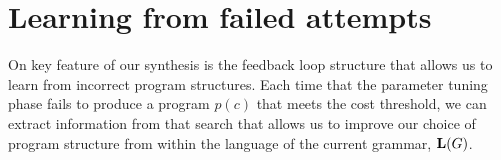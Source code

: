 \section{Learning from failed attempts}

On key feature of our synthesis is the feedback loop structure that allows us to learn from incorrect program structures.
Each time that the parameter tuning phase fails to produce a program $p(c)$ that meets the cost threshold, we can extract information from that search that allows us to improve our choice of program structure from within the language of the current grammar, $\mathbf{L}(G)$.
